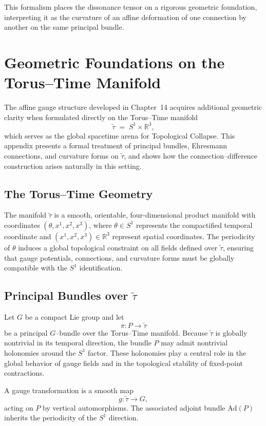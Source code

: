 \documentclass[12pt,openany]{book}
\theoremstyle{plain}
\theoremstyle{definition}
\theoremstyle{remark}
\begin{document}
This formalism places the dissonance tensor on a rigorous geometric
foundation, interpreting it as the curvature of an affine deformation of one
connection by another on the same principal bundle.

\section{Geometric Foundations on the Torus--Time Manifold}

The affine gauge structure developed in Chapter~14 acquires additional
geometric clarity when formulated directly on the Torus--Time manifold
\[
\tilde{\tau} \;=\; S^1 \times \mathbb{R}^3,
\]
which serves as the global spacetime arena for Topological Collapse. This
appendix presents a formal treatment of principal bundles, Ehresmann
connections, and curvature forms on $\tilde{\tau}$, and shows how the
connection--difference construction arises naturally in this setting.

\subsection*{The Torus--Time Geometry}

The manifold $\tilde{\tau}$ is a smooth, orientable, four-dimensional
product manifold with coordinates $(\theta, x^1, x^2, x^3)$, where
$\theta \in S^1$ represents the compactified temporal coordinate and
$(x^1, x^2, x^3) \in \mathbb{R}^3$ represent spatial coordinates. The
periodicity of $\theta$ induces a global topological constraint on all
fields defined over $\tilde{\tau}$, ensuring that gauge potentials,
connections, and curvature forms must be globally compatible with the
$S^1$ identification.

\subsection*{Principal Bundles over $\tilde{\tau}$}

Let $G$ be a compact Lie group and let
\[
\pi : P \to \tilde{\tau}
\]
be a principal $G$--bundle over the Torus--Time manifold. Because
$\tilde{\tau}$ is globally nontrivial in its temporal direction, the bundle
$P$ may admit nontrivial holonomies around the $S^1$ factor. These
holonomies play a central role in the global behavior of gauge fields and
in the topological stability of fixed-point contractions.

A gauge transformation is a smooth map
\[
g : \tilde{\tau} \to G,
\]
acting on $P$ by vertical automorphisms. The associated adjoint bundle
$\mathrm{Ad}(P)$ inherits the periodicity of the $S^1$ direction.
\end{document}
